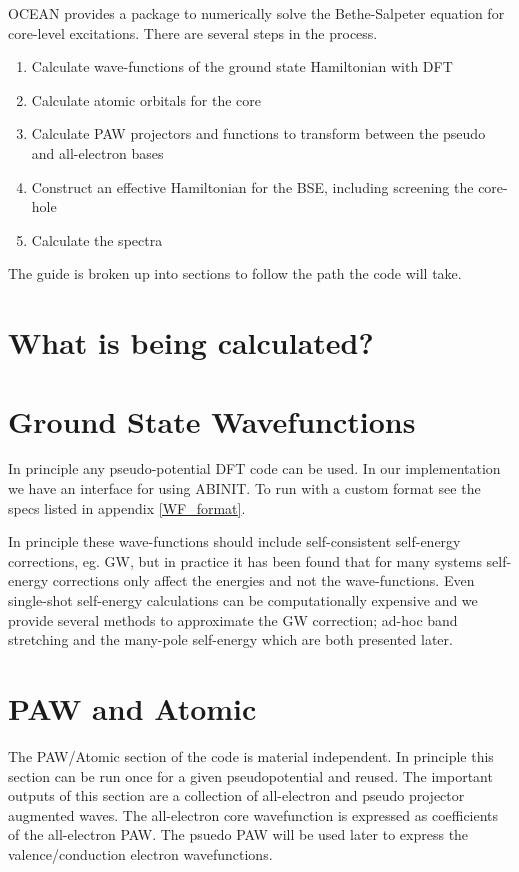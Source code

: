 \documentclass[12pt]{article}
\begin{document}
OCEAN provides a package to numerically solve the Bethe-Salpeter equation for core-level excitations. There are several steps in the process.
\begin{enumerate}
\item Calculate wave-functions of the ground state Hamiltonian with DFT
\item Calculate atomic orbitals for the core
\item Calculate PAW projectors and functions to transform between the pseudo and all-electron bases
\item Construct an effective Hamiltonian for the BSE, including screening the core-hole
\item Calculate the spectra
\end{enumerate}

The guide is broken up into sections to follow the path the code will take.

\section{What is being calculated?}




\section{Ground State Wavefunctions}
In principle any pseudo-potential DFT code can be used. In our implementation we have an interface for using ABINIT\cite{abinit}. To run with a custom format see the specs listed in appendix \ref{WF_format}.

In principle these wave-functions should include self-consistent self-energy corrections, eg. GW, but in practice it has been found that for many systems 
self-energy corrections only affect the energies and not the wave-functions. Even single-shot self-energy calculations can be computationally expensive 
and we provide several methods to approximate the GW correction; ad-hoc band stretching and the many-pole self-energy which are both presented 
later.


\section{PAW and Atomic}

The PAW/Atomic section of the code is material independent. In principle this section can be run once
for a given pseudopotential and reused. The important outputs of this section are a collection of 
all-electron and pseudo projector augmented waves. The all-electron core wavefunction is expressed
as coefficients of the all-electron PAW. The psuedo PAW will be used later to express the valence/conduction
electron wavefunctions.
\end{document}
